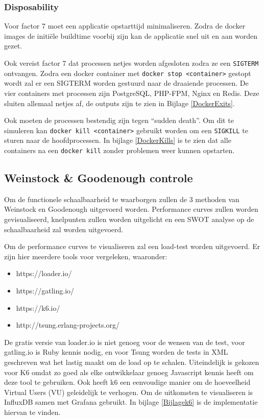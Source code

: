 \subsubsection{Disposability}
Voor factor 7 moet een applicatie opstarttijd minimaliseren. Zodra de docker images de initiële buildtime voorbij zijn kan de applicatie snel uit en aan worden gezet.

Ook vereist factor 7 dat processen netjes worden afgesloten zodra ze een \texttt{SIGTERM} ontvangen. Zodra een docker container met \texttt{docker stop <container>} gestopt wordt zal er een SIGTERM worden gestuurd naar de draaiende processen. De vier containers met processen zijn PostgreSQL, PHP-FPM, Nginx en Redis. Deze sluiten allemaal netjes af, de outputs zijn te zien in Bijlage \ref{DockerExits}.

Ook moeten de processen bestendig zijn tegen \enquote{sudden death}. Om dit te simuleren kan \texttt{docker kill <container>} gebruikt worden om een \texttt{SIGKILL} te sturen naar de hoofdprocessen. In bijlage \ref{DockerKills} is te zien dat alle containers na een \texttt{docker kill} zonder problemen weer kunnen opstarten.

\subsection{Weinstock \& Goodenough controle} \label{schaalbaarheidscontrole}
Om de functionele schaalbaarheid te waarborgen zullen de 3 methoden van Weinstock en Goodenough \parencite{OnSystemScalability} uitgevoerd worden. Performance curves zullen worden gevisualiseerd, knelpunten zullen worden uitgelicht en een SWOT analyse op de schaalbaarheid zal worden uitgevoerd.

Om de performance curves te visualiseren zal een load-test worden uitgevoerd. Er zijn hier meerdere tools voor vergeleken, waaronder:
\begin{itemize}
	\item https://loader.io/
	\item https://gatling.io/
	\item https://k6.io/
	\item http://tsung.erlang-projects.org/
\end{itemize}

De gratis versie van loader.io is niet genoeg voor de wensen van de test, voor gatling.io is Ruby kennis nodig, en voor Tsung worden de tests in XML geschreven wat het lastig maakt om de load op te schalen. Uiteindelijk is gekozen voor K6 omdat zo goed als elke ontwikkelaar genoeg Javascript kennis heeft om deze tool te gebruiken. Ook heeft k6 een eenvoudige manier om de hoeveelheid Virtual Users (VU) geleidelijk te verhogen. Om de uitkomsten te visualiseren is InfluxDB samen met Grafana gebruikt. In bijlage \ref{Bijlagek6} is de implementatie hiervan te vinden.

